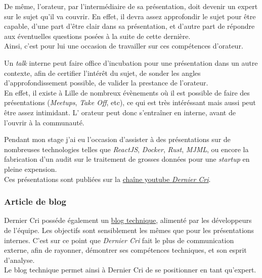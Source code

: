 \bigskip

De même, l'orateur, par l'intermédiaire de sa présentation, doit devenir
un expert sur le sujet qu'il va couvrir. En effet, il devra assez
approfondir le sujet pour être capable, d'une part d'être clair dans sa
présentation, et d'autre part de répondre aux éventuelles questions
posées à la suite de cette dernière.\\
Ainsi, c'est pour lui une occasion de travailler sur ces compétences
d'orateur.

\bigskip

Un \emph{talk} interne peut faire office d'incubation pour une
présentation dans un autre contexte, afin de certifier l'intérêt du
sujet, de sonder les angles d'approfondissement possible, de valider la
prestance de l'orateur.\\
En effet, il existe à Lille de nombreux évènements où il est possible de
faire des présentations (\emph{Meetups}, \emph{Take Off}, etc), ce qui
est très intéréssant mais aussi peut être assez intimidant. L' orateur
peut donc s'entraîner en interne, avant de l'ouvrir à la communauté.

\bigskip

Pendant mon stage j'ai eu l'occasion d'assister à des présentations sur
de nombreuses technologies telles que \emph{ReactJS}, \emph{Docker},
\emph{Rust}, \emph{MJML}, ou encore la fabrication d'un audit sur le
traitement de grosses données pour une \emph{startup} en pleine
expension.\\
Ces présentations sont publiées sur la
\href{https://www.youtube.com/channel/UCDfdBlzldhg_PEu3xZTPsHg}{chaîne
youtube \emph{Dernier Cri}}.

\bigskip

\subsubsection{Article de blog}\label{article-de-blog}

\bigskip

Dernier Cri posséde également un
\href{http://derniercri.io/tech-blog}{blog technique}, alimenté par les
développeurs de l'équipe. Les objectifs sont sensiblement les mêmes que
pour les présentations internes. C'est sur ce point que \emph{Dernier
Cri} fait le plus de communication externe, afin de rayonner, démontrer
ses compétences techniques, et son esprit d'analyse.\\
Le blog technique permet ainsi à Dernier Cri de se positionner en tant
qu'expert.

